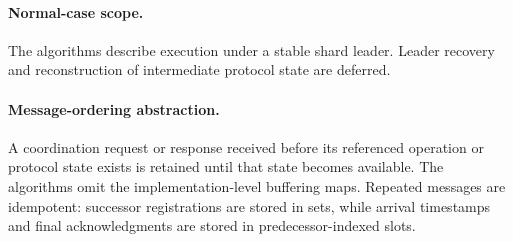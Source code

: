 \begin{algorithm}[!tb]
\begin{algorithmic}[1]
        \State {}
      \EndProcedure
    \end{algorithmic}
  \end{algorithm}


\paragraph{Normal-case scope.}
The algorithms describe execution under a stable shard leader.
Leader recovery and reconstruction of intermediate protocol state are
deferred.

\paragraph{Message-ordering abstraction.}
A coordination request or response received before its referenced
operation or protocol state exists is retained until that state
becomes available.
The algorithms omit the implementation-level buffering maps.
Repeated messages are idempotent: successor registrations are stored
in sets, while arrival timestamps and final acknowledgments are stored
in predecessor-indexed slots.


